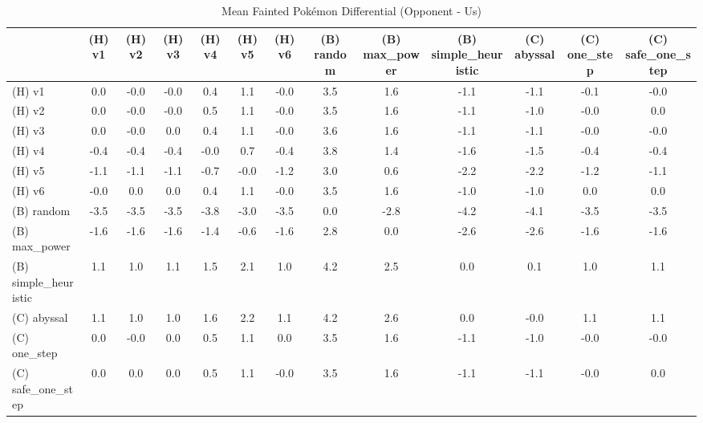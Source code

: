 \begin{table}[htbp]
\caption{Mean Fainted Pokémon Differential (Opponent - Us)}
\label{tab:fainted_diff}
\begin{tabular}{lcccccccccccc}
\hline
 & (H) v1 & (H) v2 & (H) v3 & (H) v4 & (H) v5 & (H) v6 & (B) random & (B) max\_power & (B) simple\_heuristic & (C) abyssal & (C) one\_step & (C) safe\_one\_step \\
\hline
(H) v1 & 0.0 & -0.0 & -0.0 & 0.4 & 1.1 & -0.0 & 3.5 & 1.6 & -1.1 & -1.1 & -0.1 & -0.0 \\
(H) v2 & 0.0 & -0.0 & -0.0 & 0.5 & 1.1 & -0.0 & 3.5 & 1.6 & -1.1 & -1.0 & -0.0 & 0.0 \\
(H) v3 & 0.0 & -0.0 & 0.0 & 0.4 & 1.1 & -0.0 & 3.6 & 1.6 & -1.1 & -1.1 & -0.0 & -0.0 \\
(H) v4 & -0.4 & -0.4 & -0.4 & -0.0 & 0.7 & -0.4 & 3.8 & 1.4 & -1.6 & -1.5 & -0.4 & -0.4 \\
(H) v5 & -1.1 & -1.1 & -1.1 & -0.7 & -0.0 & -1.2 & 3.0 & 0.6 & -2.2 & -2.2 & -1.2 & -1.1 \\
(H) v6 & -0.0 & 0.0 & 0.0 & 0.4 & 1.1 & -0.0 & 3.5 & 1.6 & -1.0 & -1.0 & 0.0 & 0.0 \\
(B) random & -3.5 & -3.5 & -3.5 & -3.8 & -3.0 & -3.5 & 0.0 & -2.8 & -4.2 & -4.1 & -3.5 & -3.5 \\
(B) max\_power & -1.6 & -1.6 & -1.6 & -1.4 & -0.6 & -1.6 & 2.8 & 0.0 & -2.6 & -2.6 & -1.6 & -1.6 \\
(B) simple\_heuristic & 1.1 & 1.0 & 1.1 & 1.5 & 2.1 & 1.0 & 4.2 & 2.5 & 0.0 & 0.1 & 1.0 & 1.1 \\
(C) abyssal & 1.1 & 1.0 & 1.0 & 1.6 & 2.2 & 1.1 & 4.2 & 2.6 & 0.0 & -0.0 & 1.1 & 1.1 \\
(C) one\_step & 0.0 & -0.0 & 0.0 & 0.5 & 1.1 & 0.0 & 3.5 & 1.6 & -1.1 & -1.0 & -0.0 & -0.0 \\
(C) safe\_one\_step & 0.0 & 0.0 & 0.0 & 0.5 & 1.1 & -0.0 & 3.5 & 1.6 & -1.1 & -1.1 & -0.0 & 0.0 \\
\hline
\end{tabular}
\end{table}
